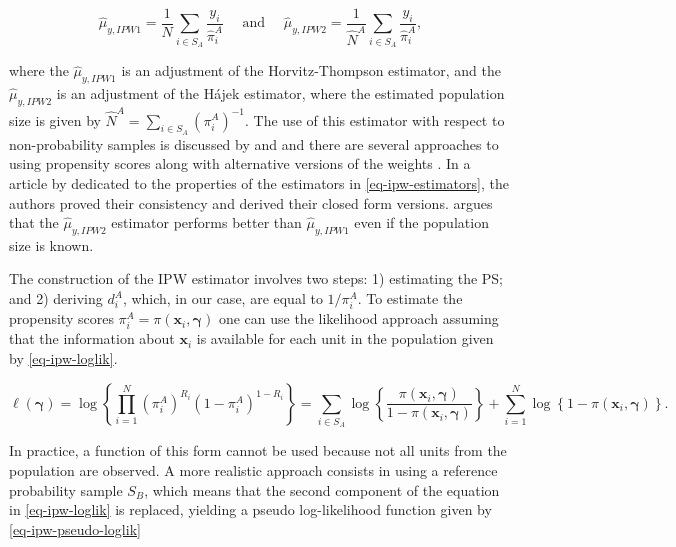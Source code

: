 \documentclass[
]{jss}
\begin{document}
\begin{equation}
  \hat{\mu}_{y,IPW1}=\frac{1}{N} \sum_{i \in S_A} \frac{y_i}{\hat{\pi}_i^A} \quad \text { and } \quad 
  \hat{\mu}_{y,IPW2}=\frac{1}{\hat{N}^A} \sum_{i \in S_A} \frac{y_i}{\hat{\pi}_i^A},
\label{eq-ipw-estimators}
\end{equation}

where the \(\hat{\mu}_{y,IPW1}\) is an adjustment of the
Horvitz-Thompson estimator, and the \(\hat{\mu}_{y,IPW2}\) is an
adjustment of the Hájek estimator, where the estimated population size
is given by \(\hat{N}^A = \sum_{i \in S_A} (\pi_i^A)^{-1}\). The use of
this estimator with respect to non-probability samples is discussed by
\citet{lee2006propensity} and
\citet[chapter 13]{biffignandi2021handbook} and there are several
approaches to using propensity scores along with alternative versions of
the weights \citep[cf.][section 3]{elliott_inference_2017}. In a article
by \citet{chen2020doubly} dedicated to the properties of the estimators
in \eqref{eq-ipw-estimators}, the authors proved their consistency and
derived their closed form versions.
\citet[section 4.2]{wu2022statistical} argues that the
\(\hat{\mu}_{y,IPW2}\) estimator performs better than
\(\hat{\mu}_{y,IPW1}\) even if the population size is known.

The construction of the IPW estimator involves two steps: 1) estimating
the PS; and 2) deriving \(d_i^A\), which, in our case, are equal to
\(1/\pi_i^A\). To estimate the propensity scores
\(\pi_i^A=\pi(\boldsymbol{x}_i, \boldsymbol{\gamma})\) one can use the
likelihood approach assuming that the information about
\(\boldsymbol{x}_i\) is available for each unit in the population given
by \eqref{eq-ipw-loglik}.

\begin{equation}
\ell(\boldsymbol{\gamma}) = \log\left\{\prod_{i=1}^N \left(\pi_i^A\right)^{R_i}\left(1-\pi_i^A\right)^{1-R_i}\right\} =
\sum_{i \in S_{A}} \log \left\{\frac{\pi\left(\boldsymbol{x}_i, \boldsymbol{\gamma}\right)}{1-\pi\left(\boldsymbol{x}_i, \boldsymbol{\gamma}\right)}\right\}+\sum_{i=1}^N \log \left\{1-\pi\left(\boldsymbol{x}_i, \boldsymbol{\gamma}\right)\right\}.
\label{eq-ipw-loglik}
\end{equation}

In practice, a function of this form cannot be used because not all
units from the population are observed. A more realistic approach
consists in using a reference probability sample \(S_B\), which means
that the second component of the equation in \eqref{eq-ipw-loglik} is
replaced, yielding a pseudo log-likelihood function given by
\eqref{eq-ipw-pseudo-loglik}
\end{document}
